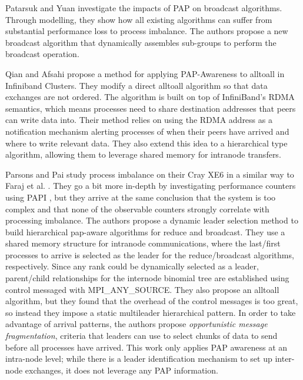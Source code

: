 Patarsuk and Yuan \cite{Patarasuk2008EffBcastDifProcArr} investigate the impacts of PAP on broadcast algorithms.
Through modelling, they show how all existing algorithms can suffer from substantial performance loss to process imbalance. 
The authors propose a new broadcast algorithm that dynamically assembles sub-groups to perform the broadcast operation.

Qian and Afsahi \cite{Qian2009ProcArrivalSHMA2AIB} propose a method for applying PAP-Awareness to alltoall in Infiniband Clusters.
They modify a direct alltoall algorithm so that data exchanges are not ordered.
The algorithm is built on top of InfiniBand's RDMA semantics, which means processes need to share destination addresses that peers can write data into. 
Their method relies on using the RDMA address as a notification mechanism alerting processes of when their peers have arrived and where to write relevant data.
They also extend this idea to a hierarchical type algorithm, allowing them to leverage shared memory for intranode transfers.

Parsons and Pai \cite{Parsons2015ExpProcImbMPICollHierarcialSys} study process imbalance on their Cray XE6 in a similar way to Faraj et al. \cite{Faraj2008StudyProcArrivalMPIColl}.
They go a bit more in-depth by investigating performance counters using PAPI \cite{Mucci1999PAPI}, but they arrive at the same conclusion that the system is too complex and that none of the observable counters strongly correlate with processing imbalance. 
The authors propose a dynamic leader selection method to build hierarchical pap-aware algorithms for reduce and broadcast.
They use a shared memory structure for intranode communications, where the last/first processes to arrive is selected as the leader for the reduce/broadcast algorithms, respectively. 
Since any rank could be dynamically selected as a leader, parent/child relationships for the internode binomial tree are established using control messaged with MPI\_ANY\_SOURCE. 
They also propose an alltoall algorithm, but they found that the overhead of the control messages is too great, so instead they impose a static multileader hierarchical pattern.
In order to take advantage of arrival patterns, the authors propose \textit{opportunistic message fragmentation}, criteria that leaders can use to select chunks of data to send before all processes have arrived.
This work only applies PAP awareness at an intra-node level; while there is a leader identification mechanism to set up inter-node exchanges, it does not leverage any PAP information.

